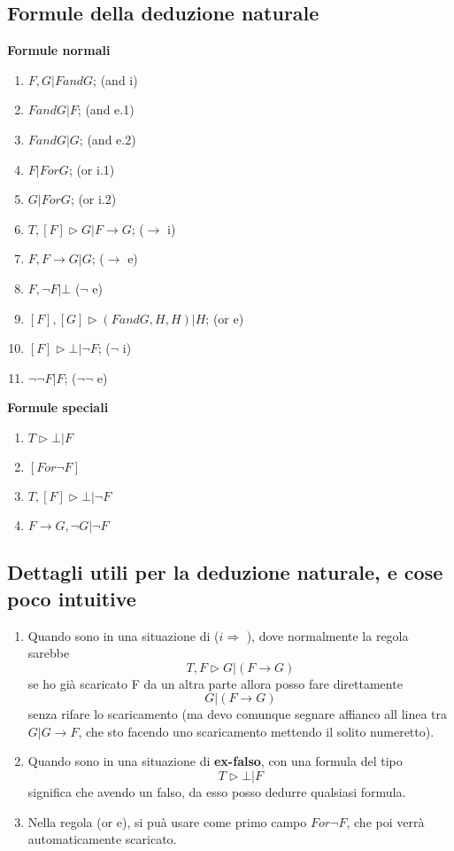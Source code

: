 \documentclass[11pt]{article}
\begin{document}
\subsection{Formule della deduzione naturale}
\textbf{Formule normali}
\begin{enumerate}
    \item $ F,G| F and G$; (and i)
    \item $F and G|F$; (and e.1)
    \item $F and G|G$; (and e.2)
    \item $F|F or G$; (or i.1)
    \item $G|F or G$; (or i.2)
    \item $T,[F] \triangleright G|F \rightarrow G$; ($\rightarrow$ i)
    \item $F,F \rightarrow G| G$; ($\rightarrow$ e)
    \item $F, \neg F| \bot$ ($\neg$ e)
    \item $[F],[G] \triangleright (F and G, H, H)| H$; (or e)
    \item $[F] \triangleright \bot | \neg F$; ($\neg$ i)
    \item $\neg \neg F| F$; ($\neg \neg$ e)
\end{enumerate}
\textbf{Formule speciali}
\begin{enumerate}
    \item $T \triangleright \bot| F$
    \item $[F or \neg F]$
    \item $T,[F] \triangleright \bot| \neg F$
    \item $F \rightarrow G, \neg G| \neg F$
\end{enumerate}
\subsection{Dettagli utili per la deduzione naturale, e cose poco intuitive}
\begin{enumerate}
    \item Quando sono in una situazione di ($i \Rightarrow$ ), 
    dove normalmente la regola sarebbe $$T,F \triangleright G|(F \rightarrow G)$$ 
    se ho già scaricato F da un altra parte allora posso fare direttamente 
    $$G|(F \rightarrow G)$$ senza rifare lo scaricamento (ma devo comunque segnare 
    affianco all linea tra $G| G \rightarrow F$, che sto facendo uno scaricamento
    mettendo il solito numeretto).
    \item Quando sono in una situazione di \textbf{ex-falso}, con una formula del tipo
    $$ T \triangleright \bot|F $$ significa che avendo un falso, da esso posso
    dedurre qualsiasi formula.
    \item Nella regola (or e), si puà usare come primo campo $F or \neg F$, che poi verrà automaticamente scaricato.
\end{enumerate}
\end{document}
